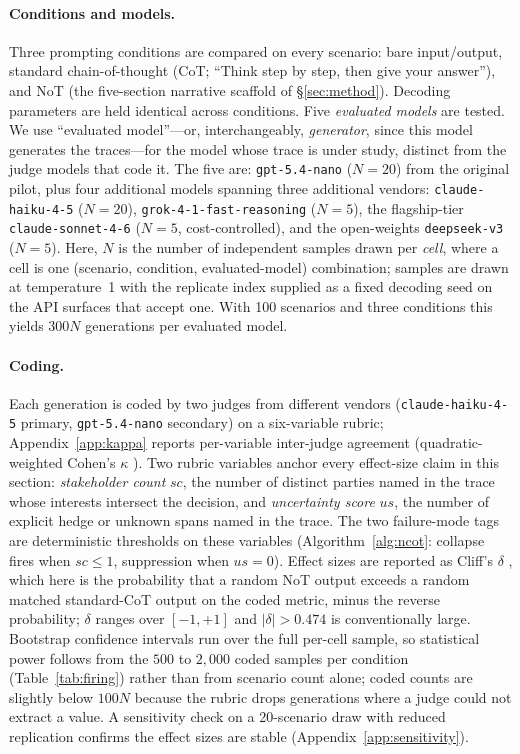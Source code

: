 \documentclass[11pt]{article}
\begin{document}
\paragraph{Conditions and models.} Three prompting conditions are
compared on every scenario: bare
input/output, standard chain-of-thought (CoT; ``Think step by step,
then give your answer''), and NoT (the five-section narrative scaffold of
\S\ref{sec:method}). Decoding parameters are held identical across
conditions. Five \emph{evaluated models} are tested. We use
``evaluated model''---or, interchangeably, \emph{generator}, since
this model generates the traces---for the model whose trace is under
study, distinct from the judge models that code it. The five are:
\texttt{gpt-5.4-nano} \citep{openai_gpt54nano} ($N{=}20$) from the
original pilot, plus four additional models spanning three additional
vendors: \texttt{claude-haiku-4-5} \citep{anthropic_haiku45}
($N{=}20$), \texttt{grok-4-1-fast-reasoning} \citep{xai_grok41}
($N{=}5$), the flagship-tier \texttt{claude-sonnet-4-6}
\citep{anthropic_sonnet46} ($N{=}5$, cost-controlled), and the
open-weights \texttt{deepseek-v3} \citep{deepseek_v3} ($N{=}5$).
Here, $N$ is the number of independent samples drawn per \emph{cell},
where a cell is one (scenario, condition, evaluated-model)
combination; samples are drawn at temperature~1 with
the replicate index supplied as a fixed decoding seed on the API
surfaces that accept one. With 100 scenarios and three conditions
this yields $300N$ generations per evaluated model.

\paragraph{Coding.} Each generation is coded by two judges from
different vendors (\texttt{claude-haiku-4-5} primary,
\texttt{gpt-5.4-nano} secondary) on a six-variable rubric;
Appendix~\ref{app:kappa} reports per-variable inter-judge agreement
(quadratic-weighted Cohen's $\kappa$ \citep{cohen60}). Two rubric
variables anchor every effect-size claim in this section:
\emph{stakeholder count}
$\mathit{sc}$, the number of distinct parties named in the trace
whose interests intersect the decision, and \emph{uncertainty score}
$\mathit{us}$, the number of explicit hedge or unknown spans named
in the trace. The two failure-mode tags are deterministic thresholds
on these variables (Algorithm~\ref{alg:ncot}: collapse fires when
$\mathit{sc} \leq 1$, suppression when $\mathit{us} = 0$).
Effect sizes are reported as Cliff's $\delta$ \citep{cliff93}, which
here is the probability that a random NoT output exceeds a random
matched standard-CoT output on the coded metric, minus the reverse
probability; $\delta$ ranges over $[-1, +1]$ and $|\delta| > 0.474$
is conventionally large. Bootstrap confidence intervals run over the
full per-cell sample, so statistical power follows from the $500$ to
$2{,}000$ coded samples per condition (Table~\ref{tab:firing}) rather
than from scenario count alone; coded counts are slightly below
$100N$ because the rubric drops generations where a judge could not
extract a value. A sensitivity check on a 20-scenario draw with
reduced replication confirms the effect sizes are stable
(Appendix~\ref{app:sensitivity}).
\end{document}
